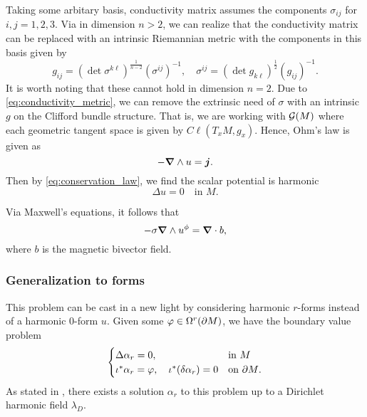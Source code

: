 Taking some arbitary basis, conductivity matrix assumes the components $\sigma_{ij}$ for $i,j=1,2,3$.  Via \cite{uhlmann_inverse_2014} in dimension $n>2$, we can realize that the conductivity matrix can be replaced with an intrinsic Riemannian metric with the components in this basis given by
\begin{equation}
\label{eq:conductivity_metric}
    g_{ij} = (\det \sigma^{k\ell} )^{\frac{1}{n-2}} (\sigma^{ij})^{-1}, \quad \sigma^{ij} = (\det g_{k\ell})^{\frac{1}{2}} (g_{ij})^{-1}.
\end{equation}
It is worth noting that these cannot hold in dimension $n=2$. Due to \cref{eq:conductivity_metric}, we can remove the extrinsic need of $\sigma$ with an intrinsic $g$ on the Clifford bundle structure. That is, we are working with $\mathcal{G}(M)$ where each geometric tangent space is given by $C\ell(T_xM,g_x)$. Hence, Ohm's law is given as
\begin{equation}
-\boldsymbol{\nabla} \wedge u = \boldsymbol{j}.
\end{equation}
Then by \cref{eq:conservation_law}, we find the scalar potential is harmonic
\begin{equation}
\Delta u = 0 \quad \textrm{in $M$}.
\end{equation}



Via Maxwell's equations, it follows that 
\begin{equation}
-\sigma \boldsymbol{\nabla} \wedge u^\phi = \boldsymbol{\nabla} \cdot b,
\end{equation}
where $b$ is the magnetic bivector field.


\subsubsection{Generalization to forms}

This problem can be cast in a new light by considering harmonic $r$-forms instead of a harmonic 0-form $u$. 
Given some $\varphi \in \Omega^r({\partial M})$, we have the boundary value problem
\begin{equation}
\begin{cases} 
\Delta \alpha_r = 0, & \textrm{in $M$}\\
\iota^* \alpha_r = \varphi, \quad \iota^*(\delta \alpha_r) = 0 & \textrm{on ${\partial M}$}.
\end{cases}
\end{equation}
As stated in \cite{belishev_dirichlet_2008}, there exists a solution $\alpha_r$ to this problem up to a Dirichlet harmonic field $\lambda_D$.



